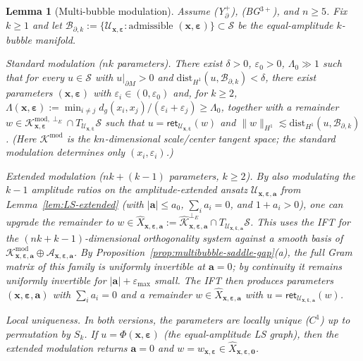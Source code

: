 \documentclass[11pt,reqno,a4paper]{amsart}
\numberwithin{equation}{section}
\theoremstyle{plain}
\newtheorem{lemma}[theorem]{Lemma}
\theoremstyle{remark}
\theoremstyle{plain}
\begin{document}
\begin{lemma}[Multi-bubble modulation]\label{lem:multi-modulation}
Assume \textup{(Y$^+_{\partial}$)}, \textup{(BG$^{3+}$)}, and $n\ge5$. Fix $k\ge1$ and let
$\mathcal B_{\partial,k}:=\big\{\mathcal U_{\mathbf x,\boldsymbol\varepsilon}:
\text{admissible }(\mathbf x,\boldsymbol\varepsilon)\big\}
\subset\mathcal S$
be the \emph{equal-amplitude} $k$-bubble manifold.

\emph{Standard modulation ($nk$ parameters).}
There exist $\delta>0$, $\varepsilon_0>0$, $\Lambda_0\gg1$ such that for every
$u\in\mathcal S$ with $u|_{\partial M}>0$ and
$\mathrm{dist}_{H^1}(u,\mathcal B_{\partial,k})<\delta$, there exist parameters
$(\mathbf x,\boldsymbol\varepsilon)$ with $\varepsilon_i\in(0,\varepsilon_0)$ and, for $k\ge2$,
$\Lambda(\mathbf x,\boldsymbol\varepsilon):=\min_{i\neq j}d_g(x_i,x_j)/(\varepsilon_i+\varepsilon_j)\ge\Lambda_0$,
together with a remainder
$w\in\mathcal K_{\mathbf x,\boldsymbol\varepsilon}^{\mathrm{mod},\perp_E}
\cap T_{\mathcal U_{\mathbf x,\boldsymbol\varepsilon}}\mathcal S$ such that
$u=\mathsf{ret}_{\mathcal U_{\mathbf x,\boldsymbol\varepsilon}}(w)$
and $\|w\|_{H^1}\lesssim\mathrm{dist}_{H^1}(u,\mathcal B_{\partial,k})$.
(Here $\mathcal K^{\mathrm{mod}}$ is the $kn$-dimensional scale/center tangent space;
the standard modulation determines only $(x_i,\varepsilon_i)$.)

\emph{Extended modulation ($nk+(k-1)$ parameters, $k\ge2$).}
By also modulating the $k-1$ amplitude ratios on the amplitude-extended ansatz
$\mathcal U_{\mathbf x,\boldsymbol\varepsilon,\mathbf a}$
from Lemma~\ref{lem:LS-extended}
(with $|\mathbf a|\le a_0$, $\sum_i a_i=0$, and $1+a_i>0$), one can upgrade the remainder to
$w\in\widehat X_{\mathbf x,\boldsymbol\varepsilon,\mathbf a}
:=\widehat{\mathcal K}_{\mathbf x,\boldsymbol\varepsilon,\mathbf a}^{\perp_E}
\cap T_{\mathcal U_{\mathbf x,\boldsymbol\varepsilon,\mathbf a}}\mathcal S$.
This uses the IFT for the $(nk+k-1)$-dimensional orthogonality system against
a smooth basis of
$\mathcal K^{\mathrm{mod}}_{\mathbf x,\boldsymbol\varepsilon,\mathbf a}
\oplus\mathcal A_{\mathbf x,\boldsymbol\varepsilon,\mathbf a}$.
By Proposition~\ref{prop:multibubble-saddle-gap}\textup{(a)}, the full Gram matrix of this family
is uniformly invertible at $\mathbf a=0$; by continuity it remains uniformly invertible for
$|\mathbf a|+\varepsilon_{\max}$ small.
The IFT then produces parameters
$(\mathbf x,\boldsymbol\varepsilon,\mathbf a)$ with $\sum_i a_i=0$ and a remainder
$w\in\widehat X_{\mathbf x,\boldsymbol\varepsilon,\mathbf a}$
with $u=\mathsf{ret}_{\mathcal U_{\mathbf x,\boldsymbol\varepsilon,\mathbf a}}(w)$.

\emph{Local uniqueness.}
In both versions, the parameters are locally unique ($C^1$) up to permutation by $S_k$.
If $u=\Phi(\mathbf x,\boldsymbol\varepsilon)$ (the equal-amplitude LS graph),
then the extended modulation returns $\mathbf a=0$
and $w=w_{\mathbf x,\boldsymbol\varepsilon}\in
\widehat X_{\mathbf x,\boldsymbol\varepsilon,\mathbf 0}$.
\end{lemma}
\end{document}
